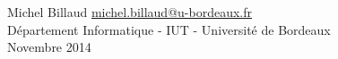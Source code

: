 \documentclass[10pt,twoside]{report}
\begin{document}
  

\maketitle

\begin{center}
Michel Billaud \url{michel.billaud@u-bordeaux.fr} \\
Département Informatique - IUT - Université de Bordeaux \\
Novembre 2014
\end{center}
\vfill

\licence

{\scriptsize
\tableofcontents
}




\newpage

\newpage

\newpage

\end{document}
